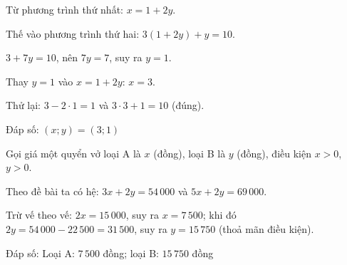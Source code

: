 \begin{problem}[9DS-HPT-002]
Từ phương trình thứ nhất: $x = 1 + 2y$.

Thế vào phương trình thứ hai: $3(1 + 2y) + y = 10$.

$3 + 7y = 10$, nên $7y = 7$, suy ra $y = 1$.

Thay $y = 1$ vào $x = 1 + 2y$: $x = 3$.

Thử lại: $3 - 2 \cdot 1 = 1$ và $3 \cdot 3 + 1 = 10$ (đúng).

Đáp số: $(x; y) = (3; 1)$
\end{problem}

\begin{problem}[9DS-HPT-005]
Gọi giá một quyển vở loại A là $x$ (đồng), loại B là $y$ (đồng), điều kiện $x > 0$, $y > 0$.

Theo đề bài ta có hệ: $3x + 2y = 54\,000$ và $5x + 2y = 69\,000$.

Trừ vế theo vế: $2x = 15\,000$, suy ra $x = 7\,500$; khi đó $2y = 54\,000 - 22\,500 = 31\,500$, suy ra $y = 15\,750$ (thoả mãn điều kiện).

Đáp số: Loại A: $7\,500$ đồng; loại B: $15\,750$ đồng
\end{problem}
